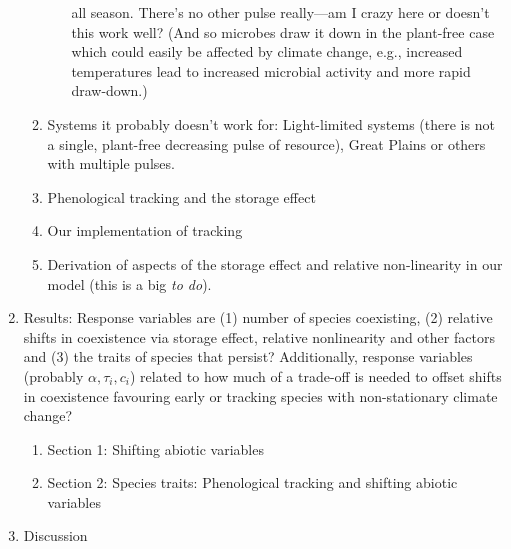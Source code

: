 \documentclass[11pt,a4paper,oneside]{article}
\begin{document}
\begin{enumerate}
\begin{enumerate}
\begin{enumerate}
  all season. There's no other pulse really---am I crazy here or
  doesn't this work well? (And so microbes draw it down in the
  plant-free case which could easily be affected by climate change,
  e.g., increased temperatures lead to increased microbial activity
  and more rapid draw-down.)
\end{enumerate}
\item Systems it probably doesn't work for: Light-limited systems
  (there is not a single, plant-free decreasing pulse of resource),
  Great Plains or others with multiple pulses.
\item Phenological tracking and the storage effect
\item Our implementation of tracking
\item Derivation of aspects of the storage effect and relative
  non-linearity in our model (this is a big \emph{to do}).
\end{enumerate}
\item Results: Response variables are (1) number of species coexisting, (2) relative shifts in coexistence via storage effect, relative nonlinearity and other factors and (3) the traits of species that persist? Additionally, response variables (probably \(\alpha, \tau_{i}, c_{i}\)) related to how much of a trade-off is needed to offset shifts in coexistence favouring early or tracking species with non-stationary climate change?
\begin{enumerate}
\item Section 1: Shifting abiotic variables
\item Section 2: Species traits: Phenological tracking and shifting
  abiotic variables
\end{enumerate}
\item Discussion
\end{enumerate}
\end{document}
